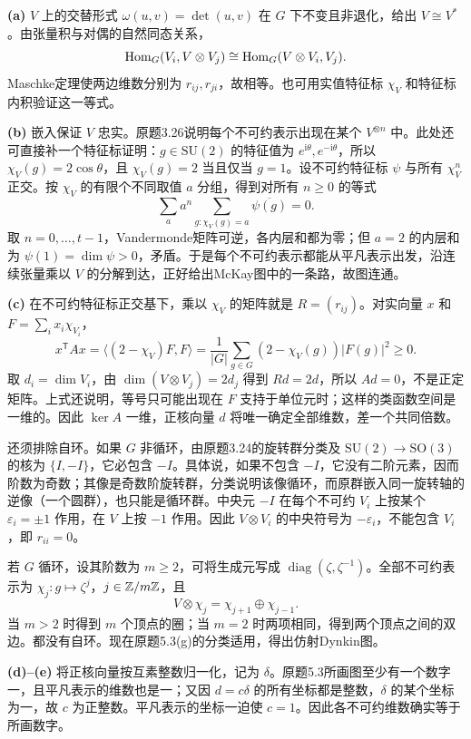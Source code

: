 \begin{solution}
\textbf{(a)} $V$ 上的交替形式 $\omega(u,v)=\det(u,v)$ 在 $G$ 下不变且非退化，给出 $V\cong V^*$。由张量积与对偶的自然同态关系，
\[
 \operatorname{Hom}_G(V_i,V\otimes V_j)\cong\operatorname{Hom}_G(V\otimes V_i,V_j).
\]
Maschke定理使两边维数分别为 $r_{ij},r_{ji}$，故相等。也可用实值特征标 $\chi_V$ 和特征标内积验证这一等式。

\textbf{(b)} 嵌入保证 $V$ 忠实。原题3.26说明每个不可约表示出现在某个 $V^{\otimes n}$ 中。此处还可直接补一个特征标证明：$g\in\mathrm{SU}(2)$ 的特征值为 $e^{\mathrm i\theta},e^{-\mathrm i\theta}$，所以 $\chi_V(g)=2\cos\theta$，且 $\chi_V(g)=2$ 当且仅当 $g=1$。设不可约特征标 $\psi$ 与所有 $\chi_V^n$ 正交。按 $\chi_V$ 的有限个不同取值 $a$ 分组，得到对所有 $n\ge0$ 的等式
\[
 \sum_a a^n\sum_{g:\chi_V(g)=a}\overline{\psi(g)}=0.
\]
取 $n=0,\ldots,t-1$，Vandermonde矩阵可逆，各内层和都为零；但 $a=2$ 的内层和为 $\psi(1)=\dim\psi>0$，矛盾。于是每个不可约表示都能从平凡表示出发，沿连续张量乘以 $V$ 的分解到达，正好给出McKay图中的一条路，故图连通。

\textbf{(c)} 在不可约特征标正交基下，乘以 $\chi_V$ 的矩阵就是 $R=(r_{ij})$。对实向量 $x$ 和 $F=\sum_i x_i\chi_{V_i}$，
\[
 x^{\mathsf T}Ax=\langle(2-\chi_V)F,F\rangle
 =\frac1{|G|}\sum_{g\in G}(2-\chi_V(g))|F(g)|^2\ge0.
\]
取 $d_i=\dim V_i$，由 $\dim(V\otimes V_j)=2d_j$ 得到 $Rd=2d$，所以 $Ad=0$，不是正定矩阵。上式还说明，等号只可能出现在 $F$ 支持于单位元时；这样的类函数空间是一维的。因此 $\ker A$ 一维，正核向量 $d$ 将唯一确定全部维数，差一个共同倍数。

还须排除自环。如果 $G$ 非循环，由原题3.24的旋转群分类及 $\mathrm{SU}(2)\to\mathrm{SO}(3)$ 的核为 $\{I,-I\}$，它必包含 $-I$。具体说，如果不包含 $-I$，它没有二阶元素，因而阶数为奇数；其像是奇数阶旋转群，分类说明该像循环，而原群嵌入同一旋转轴的逆像（一个圆群），也只能是循环群。中央元 $-I$ 在每个不可约 $V_i$ 上按某个 $\varepsilon_i=\pm1$ 作用，在 $V$ 上按 $-1$ 作用。因此 $V\otimes V_i$ 的中央符号为 $-\varepsilon_i$，不能包含 $V_i$，即 $r_{ii}=0$。

若 $G$ 循环，设其阶数为 $m\ge2$，可将生成元写成 $\operatorname{diag}(\zeta,\zeta^{-1})$。全部不可约表示为 $\chi_j:g\mapsto\zeta^j$，$j\in\mathbb Z/m\mathbb Z$，且
\[
 V\otimes\chi_j=\chi_{j+1}\oplus\chi_{j-1}.
\]
当 $m>2$ 时得到 $m$ 个顶点的圈；当 $m=2$ 时两项相同，得到两个顶点之间的双边。都没有自环。现在原题5.3(g)的分类适用，得出仿射Dynkin图。

\textbf{(d)--(e)} 将正核向量按互素整数归一化，记为 $\delta$。原题5.3所画图至少有一个数字一，且平凡表示的维数也是一；又因 $d=c\delta$ 的所有坐标都是整数，$\delta$ 的某个坐标为一，故 $c$ 为正整数。平凡表示的坐标一迫使 $c=1$。因此各不可约维数确实等于所画数字。


\end{solution}
